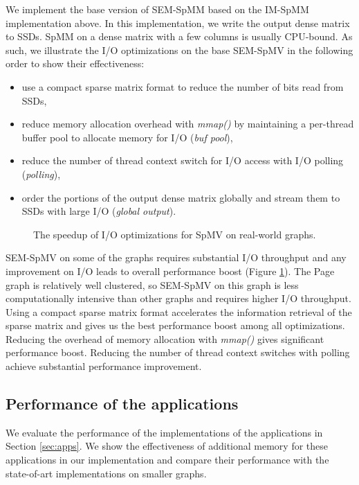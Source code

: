 We implement the base version of SEM-SpMM based on the IM-SpMM implementation
above. In this implementation, we write the output dense matrix to SSDs.
SpMM on a dense matrix with a few columns is usually CPU-bound. As such,
we illustrate the I/O optimizations on the base SEM-SpMV in the following order to show
their effectiveness:
\begin{itemize} \itemsep1pt \parskip0pt 
	\item use a compact sparse matrix format to reduce the number of bits read
		from SSDs,
	\item reduce memory allocation overhead with \textit{mmap()} by maintaining
		a per-thread buffer pool to allocate memory for I/O (\textit{buf pool}),
	\item reduce the number of thread context switch for I/O access with I/O
		polling (\textit{polling}),
	\item order the portions of the output dense matrix globally and stream them
		to SSDs with large I/O (\textit{global output}).
\end{itemize}

\begin{figure}
	\begin{center}
		\footnotesize
		
		\caption{The speedup of I/O optimizations for SpMV on real-world graphs.}
		\label{perf:spmm_opt_io}
	\end{center}
\end{figure}

SEM-SpMV on some of the graphs requires substantial I/O throughput and
any improvement on I/O leads to overall performance boost (Figure
\ref{perf:spmm_opt_io}). The Page graph is relatively well clustered, so
SEM-SpMV on this graph is less computationally intensive than other graphs
and requires higher I/O throughput.
Using a compact sparse matrix format accelerates the information retrieval
of the sparse matrix and gives us the best performance boost among all
optimizations. Reducing the overhead of memory allocation with \textit{mmap()}
gives significant performance boost. Reducing the number of thread context
switches with polling achieve substantial performance improvement. 

\subsection{Performance of the applications}

We evaluate the performance of the implementations of the applications in
Section \ref{sec:apps}. We show the effectiveness of additional memory for
these applications in our implementation and compare their performance
with the state-of-art implementations on smaller graphs.

